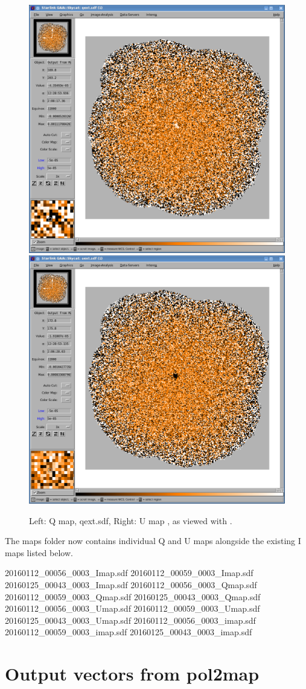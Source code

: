 \begin{figure}[t!]
\begin{center}
\includegraphics[width=0.46\linewidth]{sc22-gaia-view-qext.png}
\includegraphics[width=0.46\linewidth]{sc22-gaia-view-uext.png}
\label{fig:gaia-qext-uext}
\caption [Q and U maps in GAIA]{
  \small Left: Q map, qext.sdf, Right: U map , as viewed with \GAIA.
}
\end{center}
\end{figure}



The maps folder now contains individual Q and U maps alongside the
existing I maps listed below.

\begin{terminalv}
20160112_00056_0003_Imap.sdf  20160112_00059_0003_Imap.sdf  20160125_00043_0003_Imap.sdf
20160112_00056_0003_Qmap.sdf  20160112_00059_0003_Qmap.sdf  20160125_00043_0003_Qmap.sdf
20160112_00056_0003_Umap.sdf  20160112_00059_0003_Umap.sdf  20160125_00043_0003_Umap.sdf
20160112_00056_0003_imap.sdf  20160112_00059_0003_imap.sdf  20160125_00043_0003_imap.sdf
\end{terminalv}




\section{Output vectors from pol2map}



